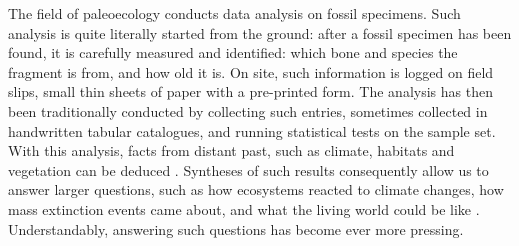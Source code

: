 \documentclass{article}
\begin{document}

The field of paleoecology conducts data analysis on fossil specimens.
Such analysis is quite literally started from the ground: after a fossil specimen has been found, it is 
carefully measured and identified: which bone and species the fragment is from, and how old it is. On site, such information is logged on field slips, small thin sheets of 
paper with a pre-printed form. The analysis has then been traditionally conducted by 
collecting such entries, sometimes collected in handwritten tabular catalogues, and running statistical 
tests on the sample set. With this analysis, facts from distant past, such as climate, habitats and 
vegetation can be deduced \cite{Faith_Lyman_2019}. Syntheses of such results consequently allow us to 
answer larger questions, such as how ecosystems reacted to climate changes, how mass extinction events 
came about, and what the living world could be like \cite{Žliobaitė2023}. Understandably, answering such 
questions has become ever more pressing.

\end{document}

